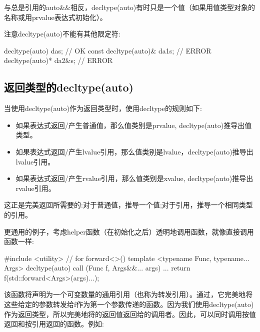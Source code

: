 与总是引用的auto\&\&相反，decltype(auto)有时只是一个值（如果用值类型对象的名称或用prvalue表达式初始化）。

注意decltype(auto)不能有其他限定符:

\begin{cppcode}
decltype(auto) da{s}; // OK
const decltype(auto)& da1{s}; // ERROR
decltype(auto)* da2{&s}; // ERROR
\end{cppcode}

\subsection{返回类型的decltype(auto)}

当使用decltype(auto)作为返回类型时，使用decltype的规则如下:

\begin{itemize}
	\item 如果表达式返回/产生普通值，那么值类别是prvalue, decltype(auto)推导出值类型。
	\item 如果表达式返回/产生lvalue引用，那么值类别是lvalue，decltype(auto)推导出lvalue引用。
	\item 如果表达式返回/产生rvalue引用，那么值类别是xvalue, decltype(auto)推导出rvalue引用。
\end{itemize}

这正是完美返回所需要的:对于普通值，推导一个值;对于引用，推导一个相同类型的引用。

更通用的例子，考虑helper函数（在初始化之后）透明地调用函数，就像直接调用函数一样:

\begin{cppcode}
#include <utility> // for forward<>()
template <typename Func, typename... Args>
decltype(auto) call (Func f, Args&&... args)
{
	...
	return f(std::forward<Args>(args)...);
}
\end{cppcode}

该函数将声明为一个可变数量的通用引用（也称为转发引用）。通过，它完美地将这些给定的参数转发给f作为第一个参数传递的函数。因为我们使用decltype(auto)作为返回类型，所以完美地将的返回值返回给的调用者。因此，可以同时调用按值返回和按引用返回的函数。例如:

